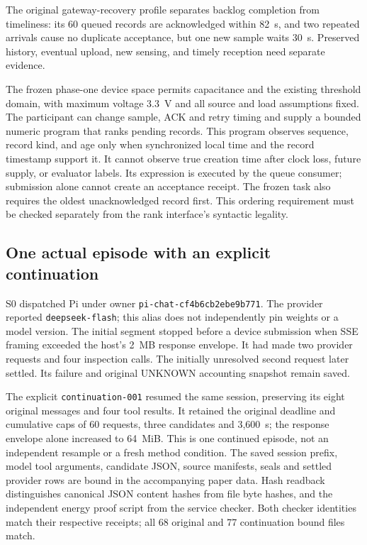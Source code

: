 The original gateway-recovery profile separates backlog completion from
timeliness: its 60 queued records are acknowledged within 82~s, and two repeated
arrivals cause no duplicate acceptance, but one new sample waits 30~s. Preserved
history, eventual upload, new sensing, and timely reception need separate evidence.

The frozen phase-one device space permits capacitance and the existing threshold
domain, with maximum voltage 3.3~V and all source and load assumptions fixed.
The participant can change sample, ACK and retry timing and supply a bounded
numeric program that ranks pending records. This program observes sequence,
record kind, and age only when synchronized local time and the record timestamp
support it. It cannot observe true creation time after clock loss, future supply,
or evaluator labels. Its expression is executed by the queue consumer;
submission alone cannot create an acceptance receipt. The frozen task also
requires the oldest unacknowledged record first. This ordering requirement
must be checked separately from the rank interface's syntactic legality.

\subsection{One actual episode with an explicit continuation}
S0 dispatched Pi under owner \texttt{pi-chat-cf4b6cb2ebe9b771}. The provider
reported \texttt{deepseek-flash}; this alias does not independently pin weights
or a model version. The initial segment stopped before a device submission when
SSE framing exceeded the host's 2~MB response envelope. It had made two provider
requests and four inspection calls. The initially unresolved second request
later settled. Its failure and original UNKNOWN accounting snapshot remain saved.

The explicit \texttt{continuation-001} resumed the same session, preserving its
eight original messages and four tool results. It retained the original deadline
and cumulative caps of 60 requests, three candidates and 3,600~s; the response
envelope alone increased to 64~MiB. This is one continued episode, not an
independent resample or a fresh method condition. The saved session prefix,
model tool arguments, candidate JSON, source manifests, seals and settled
provider rows are bound in the accompanying paper data. Hash readback distinguishes
canonical JSON content hashes from file byte hashes, and the independent energy
proof script from the service checker. Both checker identities match their
respective receipts; all 68 original and 77 continuation bound files match.


